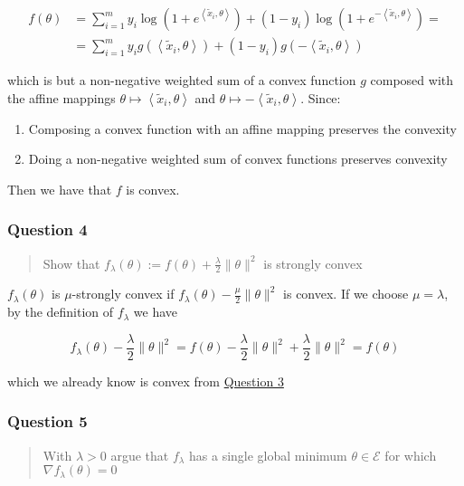 \documentclass[
]{article}
\begin{document}
\begin{align}
f(\theta) &= \sum_{i=1}^{m}y_i\log\left(1+e^{\left<\tilde{x}_i,\theta\right>}\right) + (1-y_i)\log\left(1+e^{-\left<\tilde{x}_i,\theta\right>}\right) =\\ 
&= \sum^m_{i=1}y_ig(\left<\tilde{x}_i,\theta\right>) + (1-y_i)g(-\left<\tilde{x}_i,\theta\right>)
\end{align}

which is but a non-negative weighted sum of a convex function \(g\)
composed with the affine mappings
\(\theta \mapsto \left<\tilde{x}_i,\theta\right>\) and
\(\theta \mapsto - \left<\tilde{x}_i,\theta\right>\). Since:

\begin{enumerate}
\def\labelenumi{\arabic{enumi}.}
\item
  Composing a convex function with an affine mapping preserves the
  convexity
\item
  Doing a non-negative weighted sum of convex functions preserves
  convexity
\end{enumerate}

Then we have that \(f\) is convex.

\hypertarget{question-4}{%
\subsubsection{Question 4}\label{question-4}}

\begin{quote}
Show that
\(f_\lambda(\theta) := f(\theta) + \frac{\lambda}{2}\lVert \theta \rVert^2\)
is strongly convex
\end{quote}

\(f_\lambda(\theta)\) is \(\mu\)-strongly convex if
\(f_\lambda(\theta) - \frac{\mu}{2}\lVert \theta \rVert ^2\) is convex.
If we choose \(\mu = \lambda\), by the definition of \(f_\lambda\) we
have

\[f_\lambda(\theta) - \frac{\lambda}{2}\lVert\theta\rVert^2 = f(\theta) - \frac{\lambda}{2}\lVert\theta\rVert^2 + \frac{\lambda}{2}\lVert\theta\rVert^2 = f(\theta)\]

which we already know is convex from
\protect\hyperlink{question-3-3}{Question 3}

\hypertarget{question-5}{%
\subsubsection{Question 5}\label{question-5}}

\begin{quote}
With \(\lambda  > 0\) argue that \(f_\lambda\) has a single global
minimum \(\theta \in \mathcal{E}\) for which
\(\nabla f_\lambda(\theta) = 0\)
\end{quote}
\end{document}
